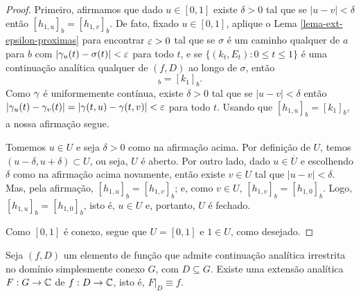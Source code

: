 \begin{proof}
        Primeiro, afirmamos que dado $u\in [0,1]$ existe $\delta > 0$ tal que se 
        $|u - v| < \delta$ então $[h_{1,u}]_b = [h_{1,v}]_b$. De fato, fixado $u\in [0,1]$,
        aplique o Lema \ref{lema-ext-epsilon-proximas} para encontrar $\varepsilon > 0$
        tal que se $\sigma$ é um caminho qualquer de $a$ para $b$ com 
        $|\gamma_u(t) - \sigma(t)| < \varepsilon$ para todo $t$, e se 
        $\{ (k_t, E_t): 0\leq t\leq 1 \}$ é uma continuação analítica qualquer de $(f,D)$
        ao longo de $\sigma$, então
        \begin{equation*}
            [h_{1,u}]_b = [k_1]_b.
        \end{equation*}
        Como $\gamma$ é uniformemente contínua, existe $\delta > 0$ tal que se $|u-v|<\delta$
        então $|\gamma_u(t) - \gamma_v(t)| = |\gamma(t,u) - \gamma(t,v)| < \varepsilon$
        para todo $t$. Usando que $[h_{1,u}]_b = [k_1]_b$, a nossa afirmação segue.
        
        Tomemos $u\in U$ e seja $\delta > 0$ como na afirmação acima. Por definição de $U$,
        temos $(u-\delta, u+\delta) \subset U$, ou seja, $U$ é aberto. Por outro lado, dado
        $u\in\overline{U}$ e escolhendo $\delta$ como na afirmação acima novamente, então 
        existe $v\in U$ tal que $|u-v| < \delta$. Mas, pela afirmação, 
        $[h_{1,u}]_b = [h_{1,v}]_b$; e, como $v\in U$, $[h_{1,v}]_b = [h_{1,0}]_b$.
        Logo, $[h_{1,u}]_b = [h_{1,0}]_b$, isto é, $u\in U$ e, portanto, $U$ é fechado.
        
        Como $[0,1]$ é conexo, segue que $U = [0,1]$ e $1\in U$, como desejado.
    \end{proof}

    \begin{corolario}
        Seja $(f,D)$ um elemento de função que admite continuação analítica irrestrita no
        domínio simplesmente conexo $G$, com $D\subseteq G$. Existe uma extensão analítica
        $F:G\to\mathbb{C}$ de $f:D\to\mathbb{C}$, isto é, $F\big|_D \equiv f$.
    \end{corolario}

